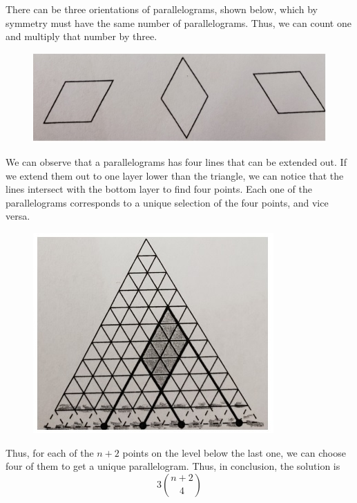 \begin{solution}
There can be three orientations of parallelograms, shown below, which by symmetry must have the same number of parallelograms. Thus, we can count one and multiply that number by three.
\begin{figure}[H]
\includegraphics[scale=1]{figures/TRIANGLE23.jpg}
\centering
\end{figure}
We can observe that a parallelograms has four lines that can be extended out. If we extend them out to one layer lower than the triangle, we can notice that the lines intersect with the bottom layer to find four points. Each one of the parallelograms corresponds to a unique selection of the four points, and vice versa.
\begin{figure}
\includegraphics[scale=1]{figures/TRIANGLE24.jpg}
\centering
\end{figure}
Thus, for each of the $n+2$ points on the level below the last one, we can choose four of them to get a unique parallelogram. Thus, in conclusion, the solution is \[3\binom{n+2} 4\]
\end{solution}


